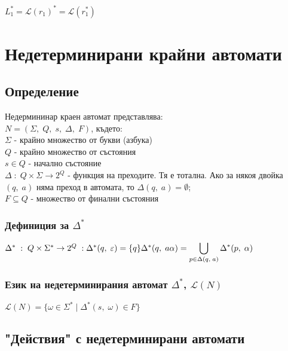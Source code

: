 \documentclass[12pt]{article}
\newcommand{\Lang}{\mathcal{L}}
\begin{document}
$L_1^* = \Lang(r_1)^* = \Lang(r_1^*)$

\section*{Недетерминирани крайни автомати}

\subsection*{Определение}

Недермининар краен автомат представлява: \\

$N = (\Sigma, \; Q, \; s, \; \Delta, \; F)$, където: \\

$\Sigma$ - крайно множество от букви (азбука) \\

$Q$ - крайно множество от състояния \\

$s \in Q$ - начално състояние \\

$\Delta \; : \; Q \times \Sigma \to 2^Q $ - функция на преходите. Тя е тотална. Ако за някоя двойка $(q, \; a)$ няма преход в автомата, то $\Delta(q, \; a) = \emptyset$; \\

$F \subseteq Q$ - множество от финални състояния \\

\subsubsection*{Дефиниция за $\Delta^*$}

$\Delta^* \; : \; Q\times\Sigma^* \to 2^Q \; : \; \\\\
\Delta^*(q, \; \varepsilon) = \{q\} \\\\
\Delta^*(q, \; a\alpha) = \displaystyle\bigcup_{p \in \Delta(q, \; a)} \Delta^*(p, \; \alpha) $

\subsubsection*{Език на недетерминирания автомат $\Delta^*$, $\Lang(N)$}

$\Lang(N) = \{\omega \in \Sigma^* \; | \; \Delta^*(s, \; \omega) \in F\}$

\subsection*{"Действия" с недетерминирани автомати}
\end{document}
